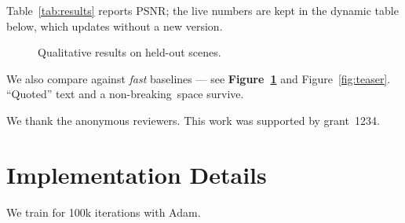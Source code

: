 \documentclass[sigconf]{acmart}
\begin{document}
Table~\ref{tab:results} reports PSNR; the live numbers are kept in the dynamic table
below, which updates without a new version.

\begin{table}
  \caption{Ablations, updated as runs finish.}
  \label{tab:ablation}
\end{table}

\begin{figure}
  \caption{Qualitative results on held-out scenes.}
  \label{fig:qual}
\end{figure}

We also compare against \emph{fast} baselines --- see \textbf{Figure~\ref{fig:qual}} and
Figure~\ref{fig:teaser}. ``Quoted'' text and a non-breaking~space survive.

\begin{acks}
We thank the anonymous reviewers. This work was supported by grant~1234.
\end{acks}




\appendix

\section{Implementation Details}

We train for 100k iterations with Adam.
\end{document}
